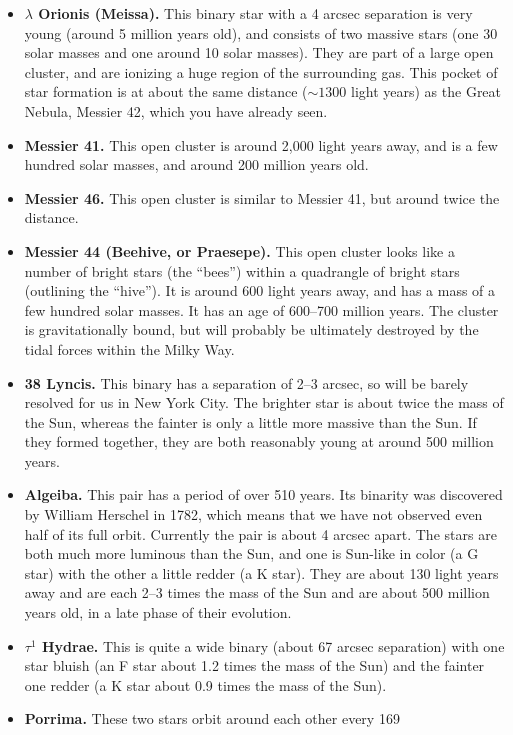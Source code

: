 \begin{itemize}
\item {\bf $\lambda$ Orionis (Meissa).} This binary star with
a 4 arcsec separation is very young (around 5 million years old), and
  consists of two massive stars (one 30 solar masses and one around 10
  solar masses). They are part of a large open cluster, and are
  ionizing a huge region of the surrounding gas. This pocket of star
  formation is at about the same distance ($\sim 1300$ light years) as
  the Great Nebula, Messier 42, which you have already seen.
\item {\bf Messier 41.} This open cluster is around 2,000 light years
  away, and is a few hundred solar masses, and around 200 million
  years old.
\item {\bf Messier 46.} This open cluster is similar to Messier 41,
  but around twice the distance.
\item {\bf Messier 44 (Beehive, or Praesepe).} This open cluster looks like a
  number of bright stars (the ``bees'') within a quadrangle of bright
  stars (outlining the ``hive''). It is around 600 light years away,
  and has a mass of a few hundred solar masses. It has an age of
  600--700 million years. The cluster is gravitationally bound, but
  will probably be ultimately destroyed by the tidal forces within the
  Milky Way. 
\item {\bf 38 Lyncis.} This binary has a separation of 2--3 arcsec, so
  will be barely resolved for us in New York City. The brighter star
  is about twice the mass of the Sun, whereas the fainter is only a
  little more massive than the Sun. If they formed together, they are
  both reasonably young at around 500 million years.
\item {\bf Algeiba.} This pair has a period of over 510 years. Its
  binarity was discovered by William Herschel in 1782, which means
  that we have not observed even half of its full orbit. Currently the
  pair is about 4 arcsec apart. The stars are both much more luminous
  than the Sun, and one is Sun-like in color (a G star) with the other
  a little redder (a K star).  They are about 130 light years away and
  are each 2--3 times the mass of the Sun and are about 500 million
  years old, in a late phase of their evolution.
\item {\bf $\tau^1$ Hydrae.} This is quite a wide binary (about 67
  arcsec separation) with one star bluish (an F star about 1.2 times
  the mass of the Sun) and the fainter one redder (a K star about 0.9
  times the mass of the Sun).
\item {\bf Porrima.} These two stars orbit around each other every 169

\end{itemize}
